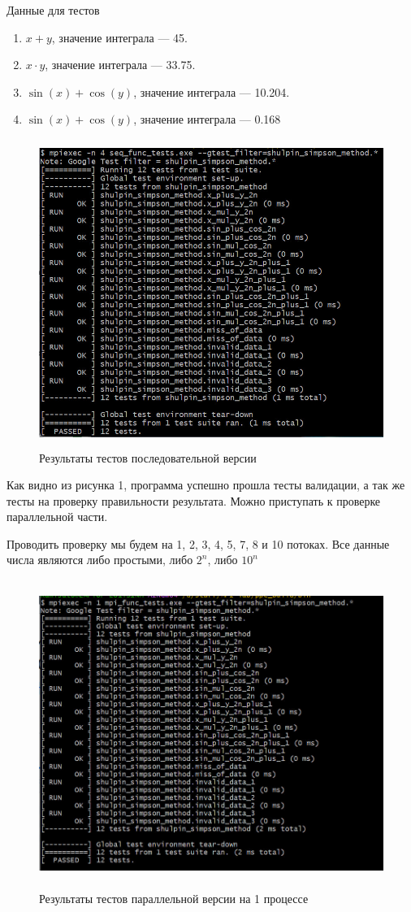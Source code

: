 \documentclass[12pt,a4paper]{article}
\begin{document}
Данные для тестов
\begin{enumerate}
    \item $x + y$, значение интеграла --- 45.
    \item $x \cdot y$, значение интеграла --- 33.75.
    \item $\sin(x) + \cos(y)$, значение интеграла --- 10.204.
    \item $\sin(x) + \cos(y)$, значение интеграла --- 0.168
\end{enumerate}

\begin{figure}[H]
\centering
\includegraphics[height=10cm]{img/seqfunctests.jpg}
\caption{\label{fig:visualClass} Результаты тестов последовательной версии}
\end{figure}

Как видно из рисунка 1, программа успешно прошла тесты валидации, а так же тесты на проверку правильности результата. Можно приступать к проверке параллельной части.

Проводить проверку мы будем на 1, 2, 3, 4, 5, 7, 8 и 10 потоках. Все данные числа являются либо простыми, либо \(2^{n}\), либо \(10^{n}\)

\begin{figure}[H]
\centering
\includegraphics[height=10cm]{img/1nmpitest.jpg}
\caption{\label{fig:visualClass} Результаты тестов параллельной версии на 1 процессе}
\end{figure}
\end{document}
